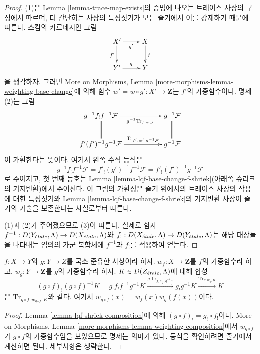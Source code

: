 \begin{proof}
(1)은 Lemma \ref{lemma-trace-map-exists}의 증명에 나오는 트레이스
사상의 구성에서 따르며, 더 간단히는 사상의 특징짓기가 모든 줄기에서
이를 강제하기 때문에 따른다. 스킴의 카르테시안 그림
$$
\xymatrix{
X' \ar[r]_{g'} \ar[d]_{f'} & X \ar[d]^f \\
Y' \ar[r]^g & Y
}
$$
을 생각하자. 그러면 More on Morphisms, Lemma
\ref{more-morphisms-lemma-weighting-base-change}에 의해 함수
$w' = w \circ g' : X' \to \mathbf{Z}$는 $f'$의 가중함수이다.
명제 (2)는 그림
$$
\xymatrix{
g^{-1}f_!f^{-1}\mathcal{F}
\ar[rr]_-{g^{-1}\text{Tr}_{f, w, \mathcal{F}}} \ar@{=}[d] & &
g^{-1}\mathcal{F} \ar@{=}[d] \\
f'_!(f')^{-1}g^{-1}\mathcal{F}
\ar[rr]^-{\text{Tr}_{f', w', g^{-1}\mathcal{F}}} & &
g^{-1}\mathcal{F}
}
$$
이 가환한다는 뜻이다. 여기서 왼쪽 수직 등식은
$$
g^{-1}f_!f^{-1}\mathcal{F} =
f'_!(g')^{-1}f^{-1}\mathcal{F} =
f'_!(f')^{-1}g^{-1}\mathcal{F}
$$
로 주어지고, 첫 번째 등호는 Lemma
\ref{lemma-lqf-base-change-f-shriek}(아래쪽 슈리크의 기저변환)에서
주어진다. 이 그림의 가환성은 줄기 위에서의 트레이스 사상의 작용에
대한 특징짓기와 Lemma \ref{lemma-lqf-base-change-f-shriek}의
기저변환 사상이 줄기의 기술을 보존한다는 사실로부터 따른다.

\medskip\noindent
(1)과 (2)가 주어졌으므로 (3)이 따른다. 실제로 함자
$f^{-1} : D(Y_{\acute{e}tale}, \Lambda) \to D(X_{\acute{e}tale}, \Lambda)$와
$f_! : D(X_{\acute{e}tale}, \Lambda) \to D(Y_{\acute{e}tale}, \Lambda)$는 해당 대상들을
나타내는 임의의 가군 복합체에 $f^{-1}$과 $f_!$를 적용하여 얻는다.
\end{proof}

\begin{lemma}
\label{lemma-trace-composition}
$f : X \to Y$와 $g : Y \to Z$를 국소 준유한 사상이라 하자.
$w_f : X \to \mathbf{Z}$를 $f$의 가중함수라 하고,
$w_g : Y \to \mathbf{Z}$를 $g$의 가중함수라 하자.
$K \in D(Z_{\acute{e}tale}, \Lambda)$에 대해 합성
$$
(g \circ f)_!(g \circ f)^{-1}K =
g_! f_! f^{-1} g^{-1}K
\xrightarrow{g_! \text{Tr}_{f, w_f, g^{-1}K}}
g_!g^{-1}K
\xrightarrow{\text{Tr}_{g, w_g, K}}
K
$$
은 $\text{Tr}_{g \circ f, w_{g \circ f}, K}$와 같다. 여기서
$w_{g \circ f}(x) = w_f(x) w_g(f(x))$이다.
\end{lemma}

\begin{proof}
Lemma \ref{lemma-lqf-shriek-composition}에 의해
$(g \circ f)_! = g_! \circ f_!$이다. More on Morphisms, Lemma
\ref{more-morphisms-lemma-weighting-composition}에서
$w_{g \circ f}$가 $g \circ f$의 가중함수임을 보았으므로 명제는
의미가 있다. 등식을 확인하려면 줄기에서 계산하면 된다.
세부사항은 생략한다.
\end{proof}

